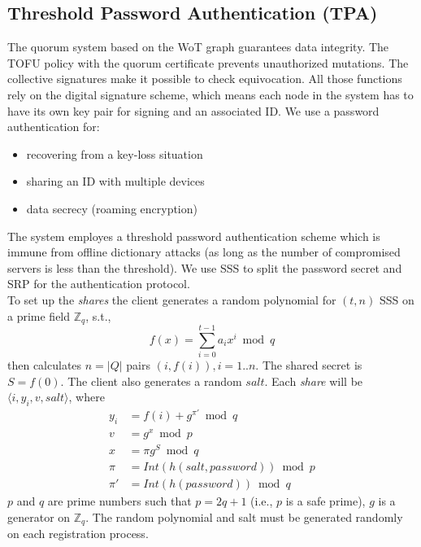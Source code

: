\subsection{Threshold Password Authentication (TPA)}
\label{threshold}
The quorum system based on the WoT graph guarantees data
integrity. The TOFU policy with the quorum certificate prevents
unauthorized mutations. The collective signatures make it possible to
check equivocation. All those functions rely on the digital signature
scheme, which means each node in the system has to have its own key
pair for signing and an associated ID. We use a password
authentication for:
\begin{itemize}
\item recovering from a key-loss situation
\item sharing an ID with multiple devices
\item data secrecy (roaming encryption)
\end{itemize}

The system employes a threshold password authentication scheme which
is immune from offline dictionary attacks (as long as the number of
compromised servers is less than the threshold). We use SSS to split
the password secret and SRP \cite{srp} for the authentication
protocol.\\

To set up the {\em shares} the client generates a random polynomial
for $(t, n)$ SSS on a prime field $\mathbb{Z}_q$, s.t.,
\[
  f(x) = \sum_{i=0}^{t-1}a_ix^i \bmod q
\]
then calculates $n=|Q|$ pairs $(i,f(i)), i = 1..n$. The shared secret
is $S = f(0)$. The client also generates a random $salt$. Each {\em
share} will be $\langle i, y_i, v, salt \rangle$, where
\begin{align*}
  y_i &= f(i) + g^{\pi'} \bmod q \\
  v &= g^x \bmod p \\
  x &= \pi g^S \bmod q \\
  \pi &= Int(h(salt, password)) \bmod p \\
  \pi' &= Int(h(password)) \bmod q
\end{align*}
$p$ and $q$ are prime numbers such that $p = 2q + 1$ (i.e., $p$ is a
safe prime), $g$ is a generator on $\mathbb{Z}_q$. The random
polynomial and salt must be generated randomly on each registration
process.\\

